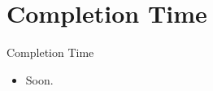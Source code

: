 \section{Completion Time}
	\begin{frame}{Completion Time}
	    \begin{itemize}
	        \item  \Large{Soon.}
	        
	    \end{itemize}
\end{frame}